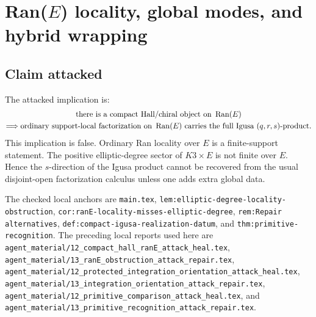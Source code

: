 \section{Ran(\(E\)) locality, global modes, and hybrid wrapping}
\label{sec:agent-14-ranE-hybrid-wrapping}

\providecommand{\Z}{\mathbb Z}
\providecommand{\C}{\mathbb C}
\providecommand{\Ran}{\operatorname{Ran}}
\providecommand{\Supp}{\operatorname{Supp}}
\providecommand{\Ext}{\operatorname{Ext}}
\providecommand{\RHom}{\operatorname{RHom}}
\providecommand{\Fact}{\mathsf{Fact}}
\providecommand{\Perf}{\operatorname{Perf}}
\providecommand{\Coh}{\operatorname{Coh}}
\providecommand{\Prim}{\operatorname{Prim}}
\providecommand{\sdim}{\operatorname{sdim}}
\providecommand{\Spch}{\mathrm{Sp}^{\mathrm{ch}}}
\providecommand{\Hall}{\mathcal H}
\providecommand{\Mloc}{\mathcal M^{\mathrm{loc}}}
\providecommand{\Mwr}{\mathcal M^{\mathrm{wr}}}
\providecommand{\Eloc}{\mathfrak E^{\mathrm{loc}}}
\providecommand{\Ewr}{\mathfrak E^{\mathrm{wr}}}
\providecommand{\Ehyb}{\mathfrak E^{\mathrm{hyb}}}

\subsection{Claim attacked}

The attacked implication is:
\[
\begin{gathered}
\hbox{there is a compact Hall/chiral object on }\Ran(E)\\
\Longrightarrow
\hbox{ordinary support-local factorization on }\Ran(E)
\hbox{ carries the full Igusa }(q,r,s)\hbox{-product}.
\end{gathered}
\]
This implication is false.  Ordinary Ran locality over \(E\) is a
finite-support statement.  The positive elliptic-degree sector of
\(K3\times E\) is not finite over \(E\).  Hence the \(s\)-direction of
the Igusa product cannot be recovered from the usual disjoint-open
factorization calculus unless one adds extra global data.

The checked local anchors are \verb|main.tex|,
\verb|lem:elliptic-degree-locality-obstruction|,
\verb|cor:ranE-locality-misses-elliptic-degree|,
\verb|rem:Repair alternatives|,
\verb|def:compact-igusa-realization-datum|, and
\verb|thm:primitive-recognition|.  The preceding local reports used
here are
\verb|agent_material/12_compact_hall_ranE_attack_heal.tex|,
\verb|agent_material/13_ranE_obstruction_attack_repair.tex|,
\verb|agent_material/12_protected_integration_orientation_attack_heal.tex|,
\verb|agent_material/13_integration_orientation_attack_repair.tex|,
\verb|agent_material/12_primitive_comparison_attack_heal.tex|, and
\verb|agent_material/13_primitive_recognition_attack_repair.tex|.

